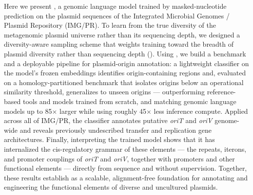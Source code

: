 Here we present \model, a genomic language model trained by masked-nucleotide
prediction on the plasmid sequences of the Integrated Microbial Genomes /
Plasmid Repository (IMG/PR). To learn from the
true diversity of the metagenomic plasmid universe rather than its sequencing
depth, we designed a diversity-aware sampling scheme that weights training
toward the breadth of plasmid diversity rather than sequencing depth
(). Using \model, we build a benchmark and a deployable
pipeline for plasmid-origin annotation: a lightweight classifier on the
model's frozen embeddings identifies origin-containing regions and, evaluated
on a homology-partitioned benchmark that isolates origins below an operational
similarity threshold, generalizes to unseen origins --- outperforming
reference-based
tools and models trained from scratch, and matching genomic language models
up to 85$\times$ larger while using roughly 45$\times$ less inference
compute. %
Applied across all of IMG/PR, the classifier annotates putative
\emph{oriT} and \emph{oriV} genome-wide and reveals previously undescribed
transfer and replication gene architectures. Finally, interpreting the
trained model shows that it has internalized the cis-regulatory grammar of
these elements --- the repeats, iterons, and promoter couplings of
\emph{oriT} and \emph{oriV}, together with promoters and other functional
elements --- directly from sequence and without supervision. Together, these
results establish \model as a scalable, alignment-free foundation for
annotating and engineering the functional elements of diverse and uncultured
plasmids.
